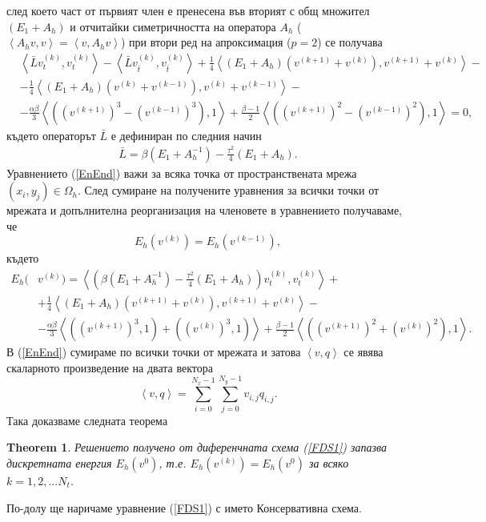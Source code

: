 \documentclass{article}
\newcommand{\be}{\begin{equation}}
\newcommand{\ee}{\end{equation}}
\newcommand{\rf}[1]{(\ref{#1})}
\newtheorem{thm}{Theorem}
\begin{document}
след което част от първият член е пренесена във вторият с общ множител $(E_1 + A_h )$ и отчитайки симетричността на оператора $A_h$ ($\left< A_h v,v\right> = \left< v, A_h v\right>$) при втори ред на апроксимация ($p=2$) се получава
\begin{align}\label{EnEnd}
&\left< \bar L  v_{t}^{(k)}, v_{t}^{(k)} \right> - \left< \bar L v_{\bar t}^{(k)}, v_{\bar t}^{(k)} \right>  
 +\frac{1}{4} \left<  (E_1 +A_h ) \left( v^{(k+1)} + v^{(k)} \right ) , v^{(k+1)} + v^{(k)} \right>  -\nonumber \\
&- \frac{1}{4} \left<  (E_1 +A_h ) \left( v^{(k)} + v^{(k-1)} \right ) , v^{(k)} + v^{(k-1)} \right> - \nonumber \\
&- \frac{\alpha \beta}{3} \left< \left( (v^{(k+1)})^3-(v^{(k-1)})^3 \right), 1 \right> + \frac{\beta - 1}{2} \left< \left( (v^{(k+1)})^2-(v^{(k-1)})^2 \right), 1 \right> =0,
\end{align}
където операторът $\bar L$ е дефиниран по следния начин
\begin{align}
\bar L = \beta (E_1+A_h^{-1})- \frac{\tau^2}{4}( E_1+A_h ).
\end{align}
Уравнението \rf{EnEnd} важи за всяка точка от пространствената мрежа $(x_i,y_j) \in \Omega_h$. След сумиране на получените уравнения за всички точки от мрежата и допълнителна реорганизация на членовете в уравнението получаваме, че
\be \label{num_en}
E_h(v^{(k)}) =E_h(v^{(k-1)}),
\ee
където
\begin{align}\label{en_norm}
E_h(&v^{(k)})=\left< \left( \beta (E_1+A_h^{-1})- \frac{\tau^2}{4}( E_1+A_h ) \right)v_{t}^{(k)} ,v_{t}^{(k)} \right>+ \nonumber\\
&+\frac{1}{4}  \left<  ( E_1+A_h)(v^{(k+1)}+v^{(k)}), v^{(k+1)}+v^{(k)} \right> - \nonumber\\
&- \frac{\alpha \beta}{3} \left< ((v^{(k+1)})^3,1)+((v^{(k)})^3,1) \right> + \frac{\beta - 1}{2} \left< \left( (v^{(k+1)})^2+(v^{(k)})^2 \right), 1 \right>.
\end{align}
В \rf{EnEnd} сумираме по всички точки от мрежата и затова  $\left< v, q \right>$ се явява скаларното произведение на двата вектора 
\be\label{dotProd}
\left<v, q \right> = \sum_{i=0}^{N_x-1} \sum_{j=0}^{N_y-1} v_{i,j} q_{i,j}.
\ee
Така доказваме следната теорема
\begin{thm}
Решението получено от диференчната схема \rf{FDS1} запазва дискретната енергия $E_h(v^0)$, т.е.  $E_h(v^{(k)}) =E_h(v^{0})$ за всяко $k=1,2,...N_t$.
\end{thm}
По-долу ще наричаме уравнение \rf{FDS1} с името Консервативна схема.
\end{document}
